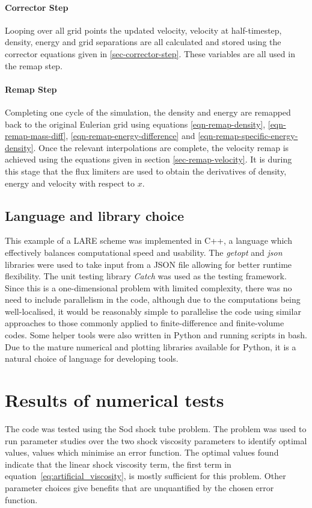 \paragraph{Corrector Step}
Looping over all grid points the updated velocity, velocity at half-timestep, density, energy and grid separations are all calculated and stored using the corrector equations given in \ref{sec-corrector-step}. These variables are all used in the remap step.

\paragraph{Remap Step}
Completing one cycle of the simulation, the density and energy are remapped back to the original Eulerian grid using equations \eqref{eqn-remap-density}, \eqref{eqn-remap-mass-diff}, \eqref{eqn-remap-energy-difference} and \eqref{eqn-remap-specific-energy-density}. Once the relevant interpolations are complete, the velocity remap is achieved using the equations given in section \ref{sec-remap-velocity}. It is during this stage that the flux limiters are used to obtain the derivatives of density, energy and velocity with respect to $x$.

\subsection{Language and library choice}
This example of a LARE scheme was implemented in C++, a language which effectively balances computational speed and usability. The \emph{getopt} and \emph{json} libraries were used to take input from a JSON file allowing for better runtime flexibility. The unit testing library \emph{Catch} was used as the testing framework. Since this is a one-dimensional problem with limited complexity, there was no need to include parallelism in the code, although due to the computations being well-localised, it would be reasonably simple to parallelise the code using similar approaches to those commonly applied to finite-difference and finite-volume codes. Some helper tools were also written in Python and running scripts in bash. Due to the mature numerical and plotting libraries available for Python, it is a natural choice of language for developing tools.

\section{Results of numerical tests}

The code was tested using the Sod shock tube problem. The problem was used to run parameter studies over the two shock viscosity parameters to identify optimal values, values which minimise an error function. The optimal values found indicate that the linear shock viscosity term, the first term in equation~\eqref{eq:artificial_viscosity}, is mostly sufficient for this problem. Other parameter choices give benefits that are unquantified by the chosen error function.


